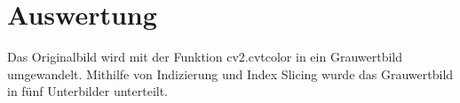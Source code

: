 \documentclass[12pt, oneside, a4paper, \docLanguage]{report}
\begin{document}
\section{Auswertung}
\label{chap:VERSUCH_1_AUSWERTUNG}
Das Originalbild wird mit der Funktion cv2.cvtcolor in ein Grauwertbild umgewandelt. Mithilfe von Indizierung und Index Slicing wurde das Grauwertbild in fünf Unterbilder unterteilt. 

\begin{figure}[hbt!]
      \centering
      \subfloat[Grauwert 5]{
}
\end{figure}
\end{document}
